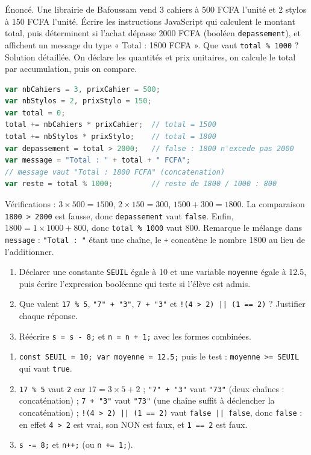 \documentclass[11pt]{article}
\begin{document}
\begin{exoresolu}
Énoncé. Une librairie de Bafoussam vend 3 cahiers à 500 FCFA l'unité et 2 stylos à 150 FCFA l'unité. Écrire les instructions JavaScript qui calculent le montant total, puis déterminent si l'achat dépasse 2000 FCFA (booléen \texttt{depassement}), et affichent un message du type « Total : 1800 FCFA ». Que vaut \texttt{total \% 1000} ?
\tcblower
Solution détaillée. On déclare les quantités et prix unitaires, on calcule le total par accumulation, puis on compare.
\begin{lstlisting}[language=JavaScript]
var nbCahiers = 3, prixCahier = 500;
var nbStylos = 2, prixStylo = 150;
var total = 0;
total += nbCahiers * prixCahier;  // total = 1500
total += nbStylos * prixStylo;    // total = 1800
var depassement = total > 2000;   // false : 1800 n'excede pas 2000
var message = "Total : " + total + " FCFA";
// message vaut "Total : 1800 FCFA" (concatenation)
var reste = total % 1000;         // reste de 1800 / 1000 : 800
\end{lstlisting}
Vérifications : $3 \times 500 = 1500$, $2 \times 150 = 300$, $1500 + 300 = 1800$. La comparaison \texttt{1800 > 2000} est fausse, donc \texttt{depassement} vaut \texttt{false}. Enfin, $1800 = 1 \times 1000 + 800$, donc \texttt{total \% 1000} vaut $800$. Remarque le mélange dans \texttt{message} : \texttt{"Total : "} étant une chaîne, le \texttt{+} concatène le nombre 1800 au lieu de l'additionner.
\end{exoresolu}

\begin{exercice}
\begin{enumerate}
\item Déclarer une constante \texttt{SEUIL} égale à 10 et une variable \texttt{moyenne} égale à 12.5, puis écrire l'expression booléenne qui teste si l'élève est admis.
\item Que valent \texttt{17 \% 5}, \texttt{"7" + "3"}, \texttt{7 + "3"} et \texttt{!(4 > 2) || (1 == 2)} ? Justifier chaque réponse.
\item Réécrire \texttt{s = s - 8;} et \texttt{n = n + 1;} avec les formes combinées.
\end{enumerate}
\end{exercice}

\begin{corrige}
\begin{enumerate}
\item \texttt{const SEUIL = 10; var moyenne = 12.5;} puis le test : \texttt{moyenne >= SEUIL} qui vaut \texttt{true}.
\item \texttt{17 \% 5} vaut \texttt{2} car $17 = 3 \times 5 + 2$ ; \texttt{"7" + "3"} vaut \texttt{"73"} (deux chaînes : concaténation) ; \texttt{7 + "3"} vaut \texttt{"73"} (une chaîne suffit à déclencher la concaténation) ; \texttt{!(4 > 2) || (1 == 2)} vaut \texttt{false || false}, donc \texttt{false} : en effet \texttt{4 > 2} est vrai, son NON est faux, et \texttt{1 == 2} est faux.
\item \texttt{s -= 8;} et \texttt{n++;} (ou \texttt{n += 1;}).
\end{enumerate}
\end{corrige}
\end{document}
